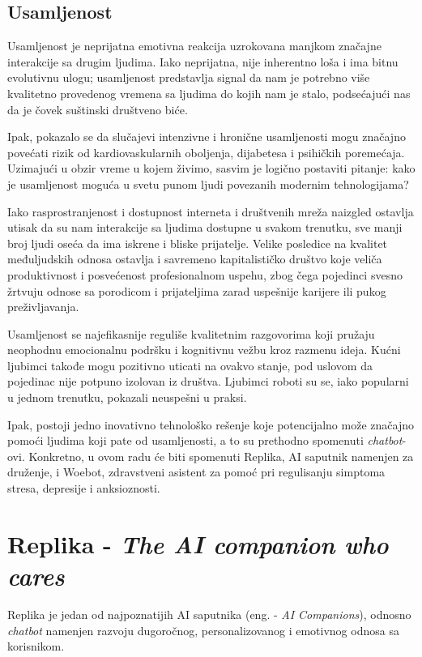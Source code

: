 \documentclass{article}
\begin{document}
\subsection{Usamljenost}

Usamljenost je neprijatna emotivna reakcija uzrokovana manjkom značajne interakcije sa drugim ljudima. Iako neprijatna, nije inherentno loša i ima bitnu evolutivnu ulogu; usamljenost predstavlja signal da nam je potrebno više kvalitetno provedenog vremena sa ljudima do kojih nam je stalo, podsećajući nas da je čovek suštinski društveno biće. 

Ipak, pokazalo se da slučajevi intenzivne i hronične usamljenosti mogu značajno povećati rizik od kardiovaskularnih oboljenja, dijabetesa i psihičkih poremećaja. Uzimajući u obzir vreme u kojem živimo, sasvim je logično postaviti pitanje: kako je usamljenost moguća u svetu punom ljudi povezanih modernim tehnologijama?

Iako rasprostranjenost i dostupnost interneta i društvenih mreža naizgled ostavlja utisak da su nam interakcije sa ljudima dostupne u svakom trenutku, sve manji broj ljudi oseća da ima iskrene i bliske prijatelje. Velike posledice na kvalitet međuljudskih odnosa ostavlja i savremeno kapitalističko društvo koje veliča produktivnost i posvećenost profesionalnom uspehu, zbog čega pojedinci svesno žrtvuju odnose sa porodicom i prijateljima zarad uspešnije karijere ili pukog preživljavanja.

Usamljenost se najefikasnije reguliše kvalitetnim razgovorima koji pružaju neophodnu emocionalnu podršku i kognitivnu vežbu kroz razmenu ideja. Kućni ljubimci takođe mogu pozitivno uticati na ovakvo stanje, pod uslovom da pojedinac nije potpuno izolovan iz društva. Ljubimci roboti su se, iako popularni u jednom trenutku, pokazali neuspešni u praksi. 

Ipak, postoji jedno inovativno tehnološko rešenje koje potencijalno može značajno pomoći ljudima koji pate od usamljenosti, a to su prethodno spomenuti \textit{chatbot}-ovi. Konkretno, u ovom radu će biti spomenuti Replika, AI saputnik namenjen za druženje, i Woebot, zdravstveni asistent za pomoć pri regulisanju simptoma stresa, depresije i anksioznosti.

\section{Replika - \textit{The AI companion who cares}}

Replika je jedan od najpoznatijih AI saputnika (eng. -  \textit{AI Companions}), odnosno \textit{chatbot} namenjen razvoju dugoročnog, personalizovanog i emotivnog odnosa sa korisnikom.
\end{document}
